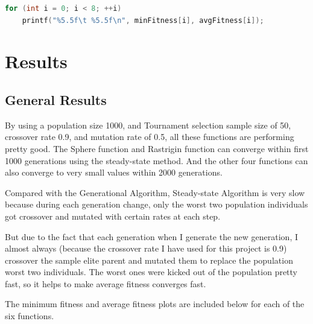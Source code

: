 \documentclass[b5paper,11pt, abstraction, titlepage]{scrartcl}
\begin{document}
\begin{CJK}{UTF8}{gbsn}
\begin{lstlisting}[language=c++]
for (int i = 0; i < 8; ++i) 
    printf("%5.5f\t %5.5f\n", minFitness[i], avgFitness[i]);
\end{lstlisting}


\section{Results}
\subsection{General Results}
By using a population size 1000, and Tournament selection sample size of 50, crossover rate 0.9, and mutation rate of 0.5, all these functions are performing pretty good. The Sphere function and Rastrigin function can converge within first 1000 generations using the steady-state method. And the other four functions can also converge to very small values within 2000 generations. 

Compared with the Generational Algorithm, Steady-state Algorithm is very slow because during each generation change, only the worst two population individuals got crossover and mutated with certain rates at each step.

But due to the fact that each generation when I generate the new generation, I almost always (because the crossover rate I have used for this project is 0.9) crossover the sample elite parent and mutated them to replace the population worst two individuals. The worst ones were kicked out of the population pretty fast, so it helps to make average fitness converges fast.

The minimum fitness and average fitness plots are included below for each of the six functions. 


\end{CJK}
\end{document}
